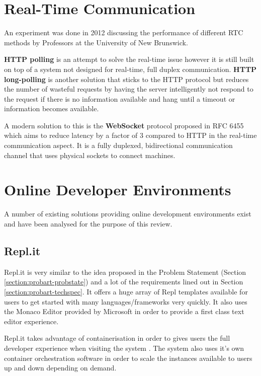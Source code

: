 \section{Real-Time Communication} \label{lit-web}

An experiment was done in 2012 discussing the performance of different RTC methods by Professors at the University of New Brunswick\cite{websocket}.

\textbf{HTTP polling} is an attempt to solve the real-time issue however it is still built on top of a system not designed for real-time, full duplex communication. \textbf{HTTP long-polling} is another solution that sticks to the HTTP protocol but reduces the number of wasteful requests by having the server intelligently not respond to the request if there is no information available and hang until a timeout or information becomes available.

A modern solution to this is the \textbf{WebSocket} protocol proposed in RFC 6455 \cite{wsrfc} which aims to reduce latency by a factor of 3 compared to HTTP in the real-time communication aspect. It is a fully duplexed, bidirectional communication channel that uses physical sockets to connect machines.

\section{Online Developer Environments} \label{lit-ode}

A number of existing solutions providing online development environments exist and have been analysed for the purpose of this review.

\subsection{Repl.it}
Repl.it is very similar to the idea proposed in the Problem Statement (Section \ref{section:probart-probstate}) and a lot of the requirements lined out in Section \ref{section:probart-techspec}. It offers a huge array of Repl templates available for users to get started with many languages/frameworks very quickly. It also uses the Monaco Editor provided by Microsoft in order to provide a first class text editor experience.

Repl.it takes advantage of containerisation in order to gives users the full developer experience when visiting the system \cite{replit-containers}. The system also uses it's own container orchestration software in order to scale the instances available to users up and down depending on demand.

